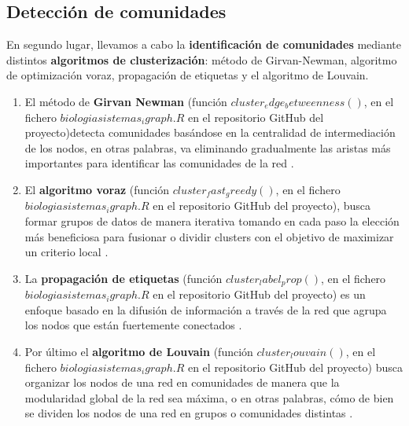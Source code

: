 \vspace{3pt}
\subsection{Detección de comunidades}

En segundo lugar, llevamos a cabo la \textbf{identificación de comunidades} mediante distintos \textbf{algoritmos de clusterización}: método de Girvan-Newman, algoritmo de optimización voraz, propagación de etiquetas y el algoritmo de Louvain. 

\vspace{3pt}
\begin{enumerate}
\item El método de \textbf{Girvan Newman} (función $cluster_edge_betweenness()$, en el fichero $biologiasistemas_igraph.R$ en el repositorio GitHub del proyecto)detecta comunidades basándose en la centralidad de intermediación de los nodos, en otras palabras, va eliminando gradualmente las aristas más importantes para identificar las comunidades de la red \cite{Zahiri2023}.


\item El \textbf{algoritmo voraz} (función $cluster_fast_greedy()$, en el fichero $biologiasistemas_igraph.R$ en el repositorio GitHub del proyecto), busca formar grupos de datos de manera iterativa tomando en cada paso la elección más beneficiosa para fusionar o dividir clusters con el objetivo de maximizar un criterio local \cite{Curtis2003}.  


\item La \textbf{propagación de etiquetas} (función $cluster_label_prop()$, en el fichero $biologiasistemas_igraph.R$ en el repositorio GitHub del proyecto) es un enfoque basado en la difusión de información a través de la red que agrupa los nodos que están fuertemente conectados \cite{Garza2019}.

\item Por último el \textbf{algoritmo de Louvain} (función $cluster_louvain()$, en el fichero $biologiasistemas_igraph.R$ en el repositorio GitHub del proyecto)  busca organizar los nodos de una red en comunidades de manera que la modularidad global de la red sea máxima, o en otras palabras, cómo de bien se dividen los nodos de una red en grupos o comunidades distintas \cite{Zhang2021}.

\end{enumerate}

\vspace{3pt}

